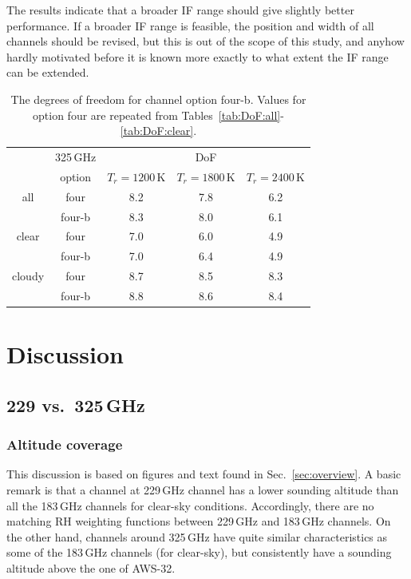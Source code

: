 \documentclass[12pt]{article}
\begin{document}
The results indicate that a broader IF range should give slightly better performance. If a broader IF range is feasible, the position and width of all channels should be revised, but this is out of the scope of this study, and anyhow hardly motivated before it is known more exactly to what extent the IF range can be extended.


\begin{table}[!bt]
	\centering
	\begin{tabular}[b]{c|c|c|c|c}
      &	325\,GHz & \multicolumn{3}{c}{DoF}   \\
      &	option &  $T_r = 1200 $\,K &   $T_r = 1800 $\,K &   $T_r = 2400$\,K \\
      \hline
      all &	four   &              8.2 &              7.8 &              6.2 \\
      & four-b   &              8.3 &              8.0   &              6.1 \\

      \hline
      clear  &	four  &                7.0 &              6.0 &              4.9 \\
      &   four-b &                7.0 &              6.4 &              4.9 \\
	
      \hline	
      cloudy &	four  &              8.7 &              8.5 &              8.3 \\
      &   four-b &              8.8 &              8.6 &              8.4 \\
      \hline
\end{tabular}
\caption{The degrees of freedom for channel option four-b. Values for option
  four are repeated from Tables~\ref{tab:DoF:all}-\ref{tab:DoF:clear}. }
\label{tab:DoF:4b}
\end{table}
\section{Discussion}

\subsection{229 vs.\ 325\,GHz}
\subsubsection{Altitude coverage}
%
This discussion is based on figures and text found in Sec.~\ref{sec:overview}.
A basic remark is that a channel at 229\,GHz channel has a lower sounding
altitude than all the 183\,GHz channels for clear-sky conditions. Accordingly,
there are no matching RH weighting functions between 229\,GHz and 183\,GHz
channels. On the other hand, channels around 325\,GHz have quite similar
characteristics as some of the 183\,GHz channels (for clear-sky), but
consistently have a sounding altitude above the one of AWS-32.
\end{document}
